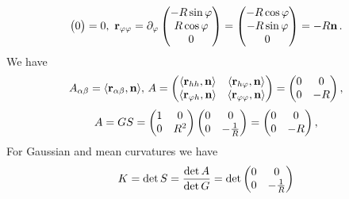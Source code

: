 \documentclass[12pt]{article}
\theoremstyle{theorem}
\numberwithin{equation}{section}
\begin{document}
{$$\begin{pmatrix}
          0\\
   \end{pmatrix}=0,\,\,
   {\bf r}_{\varphi \varphi}=\partial_\varphi
       \begin{pmatrix}
        -R\sin\varphi\\
        R\cos\varphi\\
          0\\
   \end{pmatrix}=\begin{pmatrix}
        -R\cos\varphi\\
        -R\sin\varphi\\
          0\\
   \end{pmatrix}=-R{\bf n}\,.
                      $$
We have
                    \begin{equation}\label{secquadrformforcylinder}
            A_{\alpha\beta}=\langle{\bf r}_{\alpha\beta},{\bf n}\rangle,\,
              A=\begin{pmatrix}\langle{\bf r}_{hh},{\bf n}\rangle&\langle{\bf r}_{h\varphi},{\bf n}\rangle\cr
                               \langle{\bf r}_{\varphi h},{\bf n}\rangle &\langle{\bf r}_{\varphi\varphi},{\bf n}\rangle\cr
                                   \end{pmatrix}=
                                   \begin{pmatrix}0&0\cr
                                0&-R\cr
                                   \end{pmatrix},
                    \end{equation}
                    $$
       A=GS=\begin{pmatrix}1&0\cr
                                0&R^2\cr
                                   \end{pmatrix}
                                   \begin{pmatrix}0&0\cr
                                0&-{1\over R}\cr
                                   \end{pmatrix}=
                                   \begin{pmatrix}0&0\cr
                                0&-R\cr
                                   \end{pmatrix},
                    $$
For Gaussian and mean curvatures we have
     \begin{equation}\label{Gaussianforcylinder}
        K=\det S={\det A\over \det G}=\det
                              \begin{pmatrix}0&0\cr
                                0&-{1\over R}\cr

\end{pmatrix}
\end{equation}}
\end{document}
